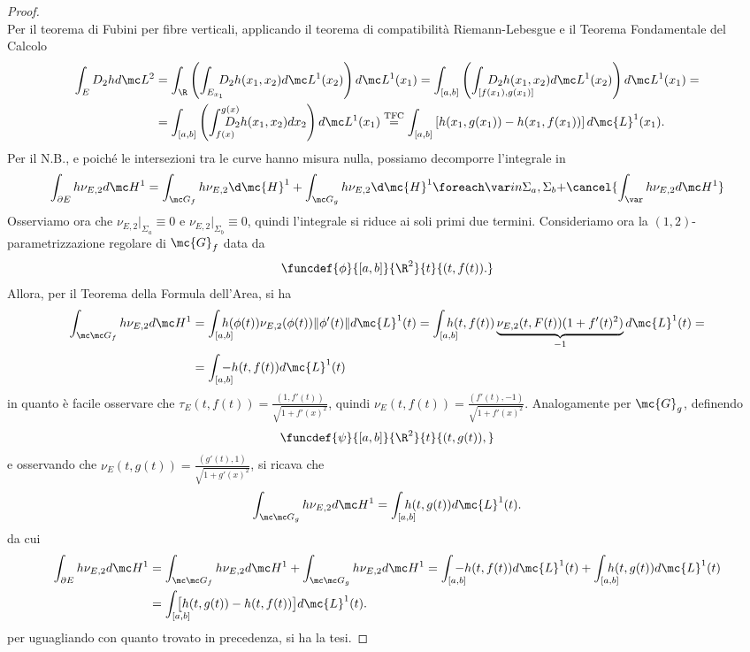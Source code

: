 \begin{proof}
    \\
    Per il teorema di Fubini per fibre verticali, applicando il teorema di compatibilità Riemann-Lebesgue e il Teorema Fondamentale del Calcolo
    \[\begin{aligned}
        \int_ED_2hd\mc L^2 &= \int_\R\left(\int_{E_{x_1}}\!\!\!\!D_2h(x_1,x_2)d\mc L^1(x_2)\right)d\mc L^1(x_1) = \int_{[a,b]}\left(\int_{[f(x_1),g(x_1)]}\hspace{-1.4 cm}D_2h(x_1,x_2)d\mc L^1(x_2)\right)d\mc L^1(x_1) = \\ &=\int_{[a,b]}\left(\int_{f(x)}^{g(x)}\hspace{-0.5 cm}D_2h(x_1,x_2)dx_2\right)d\mc L^1(x_1) \overset{\text{TFC}}{=} \int_{[a,b]}\left[ h(x_1,g(x_1)) - h(x_1,f(x_1)) \right] d\mc{L}^1(x_1).
    \end{aligned}\]
    Per il N.B., e poiché le intersezioni tra le curve hanno misura nulla, possiamo decomporre l'integrale in
    \[\int_{\partial E}h \nu_{E,2}d\mc H^1 =\int_{\mc G_f}h \nu_{E,2}\d \mc{H}^1 + \int_{\mc G_g}h \nu_{E,2}\d \mc{H}^1\foreach \var in {{\Sigma_a}, {\Sigma_b}}{+\cancel{\int_{\var} h \nu_{E,2}d\mc H^1}}\]
    Osserviamo ora che $\nu_{E,2}\big|_{\Sigma_a} \equiv 0$ e $\nu_{E,2}\big|_{\Sigma_b} \equiv 0$, quindi l'integrale si riduce ai soli primi due termini. Consideriamo ora la $(1,2)$-parametrizzazione regolare di $\mc{G}_f$ data da 
    \[\funcdef{\phi}{[a,b]}{\R^2}{t}{(t,f(t)).}\]
    Allora, per il Teorema della Formula dell'Area, si ha 
    \[\begin{aligned}  \int_{\mc \mc G_f}h\nu_{E,2}d\mc H^1 &= \int_{[a,b]}\hspace{-0.4cm}h(\phi(t))\nu_{E,2}(\phi(t))\|\phi'(t)\|d\mc{L}^1(t) = \int_{[a,b]}\hspace{-0.4cm}h(t,f(t))\underbrace{\nu_{E,2}(t,F(t))(1+f'(t)^2)}_{-1}d\mc{L}^1(t) = \\ &= \int_{[a,b]}\hspace{-0.4cm}-h(t,f(t))d\mc{L}^1(t)\end{aligned}\]
    in quanto è facile osservare che $\tau_E(t,f(t)) = \frac{(1,f'(t))}{\sqrt{1+f'(x)^2}}$, quindi $\nu_E(t,f(t)) = \frac{(f'(t),-1)}{\sqrt{1+f'(x)^2}}$. Analogamente per $\mc{G}_g$, definendo 
    \[\funcdef{\psi}{[a,b]}{\R^2}{t}{(t,g(t)),}\]
    e osservando che $\nu_E(t,g(t)) = \frac{(g'(t),1)}{\sqrt{1+g'(x)^2}}$, si ricava che 
    \[\int_{\mc \mc G_g}h\nu_{E,2}d\mc H^1 = \int_{[a,b]}\hspace{-0.4cm}h(t,g(t))d\mc{L}^1(t).\]
    da cui 
    \[\begin{aligned}\int_{\partial E}h\nu_{E,2}d\mc H^1 &= \int_{\mc \mc G_f}h\nu_{E,2}d\mc H^1 + \int_{\mc \mc G_g}h\nu_{E,2}d\mc H^1 = \int_{[a,b]}\hspace{-0.4cm}-h(t,f(t))d\mc{L}^1(t) + \int_{[a,b]}\hspace{-0.4cm}h(t,g(t))d\mc{L}^1(t) \\ &= \int_{[a,b]}\hspace{-0.4cm}\bigl[h(t,g(t)) - h(t,f(t))\bigr]d\mc{L}^1(t).\end{aligned}\]
    per uguagliando con quanto trovato in precedenza, si ha la tesi.
\end{proof}

